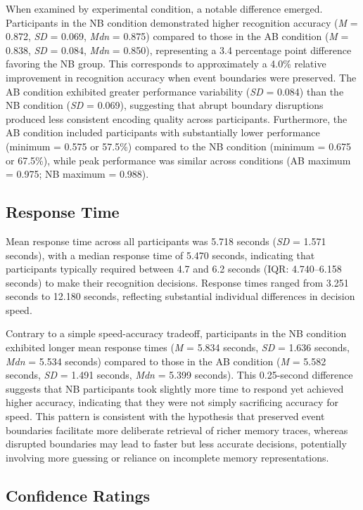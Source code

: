 When examined by experimental condition, a notable difference emerged. Participants in the NB condition demonstrated higher recognition accuracy (\textit{M} = 0.872, \textit{SD} = 0.069, \textit{Mdn} = 0.875) compared to those in the AB condition (\textit{M} = 0.838, \textit{SD} = 0.084, \textit{Mdn} = 0.850), representing a 3.4 percentage point difference favoring the NB group. This corresponds to approximately a 4.0\% relative improvement in recognition accuracy when event boundaries were preserved. The AB condition exhibited greater performance variability (\textit{SD} = 0.084) than the NB condition (\textit{SD} = 0.069), suggesting that abrupt boundary disruptions produced less consistent encoding quality across participants. Furthermore, the AB condition included participants with substantially lower performance (minimum = 0.575 or 57.5\%) compared to the NB condition (minimum = 0.675 or 67.5\%), while peak performance was similar across conditions (AB maximum = 0.975; NB maximum = 0.988).

\subsection{Response Time}

Mean response time across all participants was 5.718 seconds (\textit{SD} = 1.571 seconds), with a median response time of 5.470 seconds, indicating that participants typically required between 4.7 and 6.2 seconds (IQR: 4.740--6.158 seconds) to make their recognition decisions. Response times ranged from 3.251 seconds to 12.180 seconds, reflecting substantial individual differences in decision speed.

Contrary to a simple speed-accuracy tradeoff, participants in the NB condition exhibited longer mean response times (\textit{M} = 5.834 seconds, \textit{SD} = 1.636 seconds, \textit{Mdn} = 5.534 seconds) compared to those in the AB condition (\textit{M} = 5.582 seconds, \textit{SD} = 1.491 seconds, \textit{Mdn} = 5.399 seconds). This 0.25-second difference suggests that NB participants took slightly more time to respond yet achieved higher accuracy, indicating that they were not simply sacrificing accuracy for speed. This pattern is consistent with the hypothesis that preserved event boundaries facilitate more deliberate retrieval of richer memory traces, whereas disrupted boundaries may lead to faster but less accurate decisions, potentially involving more guessing or reliance on incomplete memory representations.

\subsection{Confidence Ratings}

